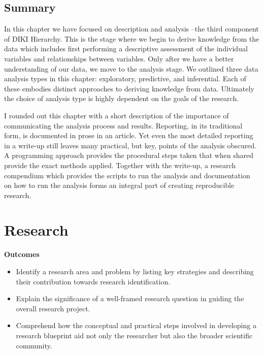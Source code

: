 \documentclass[
  letterpaper,
  krantz1]{latex/krantz-mod}
\providecommand{\tightlist}{%
  \setlength{\itemsep}{0pt}\setlength{\parskip}{0pt}}\usepackage{longtable,booktabs,array}
\newcommand{\setDOI}[1]{\gdef\doi{#1}}
\theoremstyle{definition}
\theoremstyle{definition}
\theoremstyle{remark}
\begin{document}
\section*{Summary}\label{summary-2}


In this chapter we have focused on description and analysis --the third
component of DIKI Hierarchy. This is the stage where we begin to derive
knowledge from the data which includes first performing a descriptive
assessment of the individual variables and relationships between
variables. Only after we have a better understanding of our data, we
move to the analysis stage. We outlined three data analysis types in
this chapter: exploratory, predictive, and inferential. Each of these
embodies distinct approaches to deriving knowledge from data. Ultimately
the choice of analysis type is highly dependent on the goals of the
research.

I rounded out this chapter with a short description of the importance of
communicating the analysis process and results. Reporting, in its
traditional form, is documented in prose in an article. Yet even the
most detailed reporting in a write-up still leaves many practical, but
key, points of the analysis obscured. A programming approach provides
the procedural steps taken that when shared provide the exact methods
applied. Together with the write-up, a research compendium which
provides the scripts to run the analysis and documentation on how to run
the analysis forms an integral part of creating reproducible research.

\chapter{Research}\label{sec-research-chapter}

\setDOI{10.4324/9781003393764.4}
\thispagestyle{chapterfirstpage}

\begin{tcolorbox}[enhanced jigsaw, leftrule=.75mm, colframe=quarto-callout-color-frame, left=2mm, colback=white, toprule=.15mm, breakable, arc=.35mm, opacityback=0, bottomrule=.15mm, rightrule=.15mm]

\textbf{ Outcomes}

\begin{itemize}
\tightlist
\item
  Identify a research area and problem by listing key strategies and
  describing their contribution towards research identification.
\item
  Explain the significance of a well-framed research question in guiding
  the overall research project.
\item
  Comprehend how the conceptual and practical steps involved in
  developing a research blueprint aid not only the researcher but also
  the broader scientific community.
\end{itemize}

\end{tcolorbox}
\end{document}
